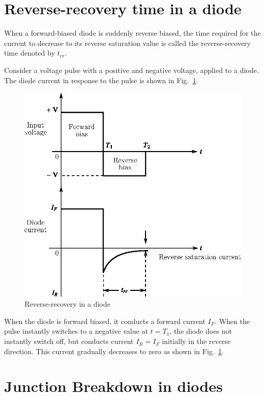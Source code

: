\section{Reverse-recovery time in a diode}\label{sec1.21}

When a forward-biased diode is suddenly reverse biased, the time
required for the current to decrease to its reverse saturation value
is called the reverse-recovery time denoted by $t_{rr}$.

Consider a voltage pulse with a positive and negative voltage, applied
to a diode. The diode current in response to the pulse is shown in
Fig.~\ref{fig1.21}.
\begin{figure}[H]
\centering
\includegraphics[scale=.91]{chap1/fig1.21.eps}
\caption{Reverse-recovery in a diode}\label{fig1.21}
\end{figure}

When the diode is forward biased, it conducts a forward current
$I_F$. When the pulse instantly switches to a negative value at $t =
T_1$, the diode does not instantly switch off, but conducts current
$I_R = I_F$ initially in the reverse direction. This current gradually
decreases to zero as shown in Fig.~\ref{fig1.21}.

\section{Junction Breakdown in diodes}\label{sec1.22}

